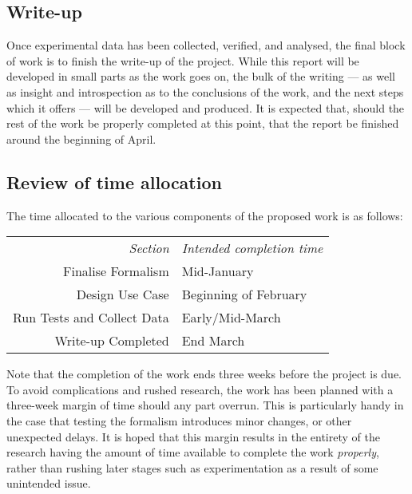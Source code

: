\subsection{Write-up}
Once experimental data has been collected, verified, and analysed, the final block of work is to finish the write-up of the project. While this report will be developed in small parts as the work goes on, the bulk of the writing --- as well as insight and introspection as to the conclusions of the work, and the next steps which it offers --- will be developed and produced. It is expected that, should the rest of the work be properly completed at this point, that the report be finished around the beginning of April.


\subsection{Review of time allocation}
The time allocated to the various components of the proposed work is as follows:
\begin{tabular}{r|l}
    \emph{Section} & \emph{Intended completion time}\\
    Finalise Formalism & Mid-January\\
    Design Use Case & Beginning of February\\
    Run Tests and Collect Data & Early/Mid-March\\
    Write-up Completed & End March\\
\end{tabular}\par

Note that the completion of the work ends three weeks before the project is due. To avoid complications and rushed research, the work has been planned with a three-week margin of time should any part overrun. This is particularly handy in the case that testing the formalism introduces minor changes, or other unexpected delays. It is hoped that this margin results in the entirety of the research having the amount of time available to complete the work \emph{properly}, rather than rushing later stages such as experimentation as a result of some unintended issue.\par
